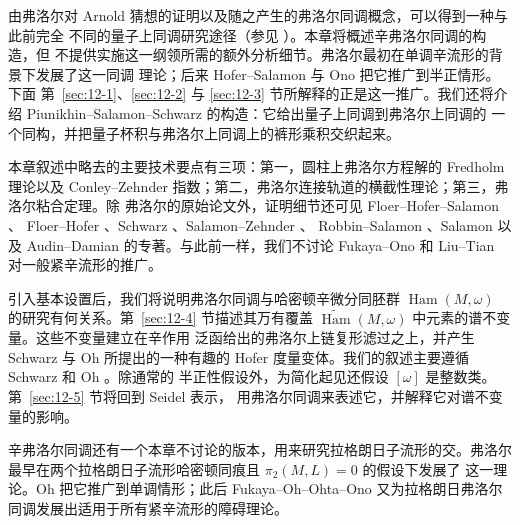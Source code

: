 
由弗洛尔对 Arnold 猜想的证明以及随之产生的弗洛尔同调概念，可以得到一种与此前完全
不同的量子上同调研究途径（参见 ）。本章将概述辛弗洛尔同调的构造，但
不提供实施这一纲领所需的额外分析细节。弗洛尔最初在单调辛流形的背景下发展了这一同调
理论；后来 Hofer--Salamon  与 Ono  把它推广到半正情形。下面
第~\ref{sec:12-1}、\ref{sec:12-2} 与 \ref{sec:12-3} 节所解释的正是这一推广。我们还将介绍
Piunikhin--Salamon--Schwarz  的构造：它给出量子上同调到弗洛尔上同调的
一个同构，并把量子杯积与弗洛尔上同调上的裤形乘积交织起来。

本章叙述中略去的主要技术要点有三项：第一，圆柱上弗洛尔方程解的 Fredholm 理论以及
Conley--Zehnder 指数；第二，弗洛尔连接轨道的横截性理论；第三，弗洛尔粘合定理。除
弗洛尔的原始论文外，证明细节还可见 Floer--Hofer--Salamon 、
Floer--Hofer 、Schwarz 、Salamon--Zehnder 、
Robbin--Salamon 、Salamon  以及 Audin--Damian
 的专著。与此前一样，我们不讨论 Fukaya--Ono  和
Liu--Tian  对一般紧辛流形的推广。

引入基本设置后，我们将说明弗洛尔同调与哈密顿辛微分同胚群
$\operatorname{Ham}(M,\omega)$ 的研究有何关系。第~\ref{sec:12-4} 节描述其万有覆盖
$\widetilde{\operatorname{Ham}}(M,\omega)$ 中元素的谱不变量。这些不变量建立在辛作用
泛函给出的弗洛尔上链复形滤过之上，并产生 Schwarz 与 Oh 所提出的一种有趣的 Hofer
度量变体。我们的叙述主要遵循 Schwarz  和 Oh 。除通常的
半正性假设外，为简化起见还假设 $[\omega]$ 是整数类。第~\ref{sec:12-5} 节将回到 Seidel 表示，
用弗洛尔同调来表述它，并解释它对谱不变量的影响。

辛弗洛尔同调还有一个本章不讨论的版本，用来研究拉格朗日子流形的交。弗洛尔
 最早在两个拉格朗日子流形哈密顿同痕且 $\pi_2(M,L)=0$ 的假设下发展了
这一理论。Oh  把它推广到单调情形；此后 Fukaya--Oh--Ohta--Ono
 又为拉格朗日弗洛尔同调发展出适用于所有紧辛流形的障碍理论。

